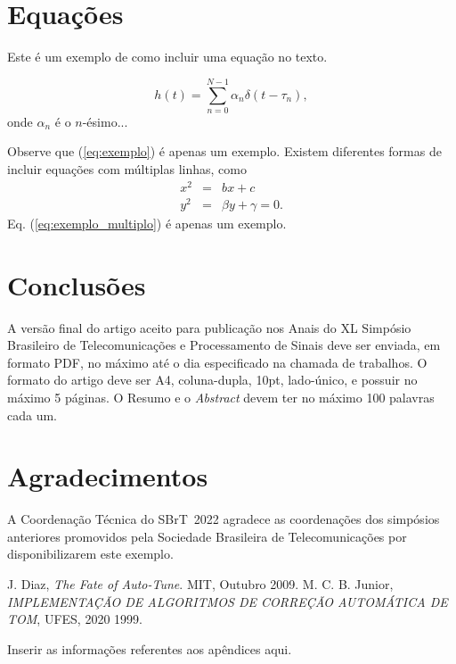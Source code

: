 \documentclass{sbrt}
\begin{document}

\section{Equações}

Este é um exemplo de como incluir uma equação no texto.

\begin{equation}\label{eq:exemplo}
    h(t)=\sum_{n=0}^{N-1} \alpha_n\delta(t-\tau_n),
\end{equation}
onde $\alpha_n$ é o $n$-ésimo...

Observe que (\ref{eq:exemplo}) é apenas um exemplo. Existem diferentes formas de incluir equações com múltiplas linhas, como
\begin{equation} \label{eq:exemplo_multiplo}
    \begin{array}{ccl}
        x^2 & = & bx+c\\
        y^2 & = &\beta y+\gamma=0.
    \end{array}
\end{equation}
Eq. (\ref{eq:exemplo_multiplo}) é apenas um exemplo.


\section{Conclusões}
A versão final do artigo aceito para publicação nos Anais do XL Simpósio Brasileiro de Telecomunicações e Processamento de Sinais deve ser enviada, em formato PDF, no máximo até o dia especificado na chamada de trabalhos. O formato do artigo deve ser A4, coluna-dupla, 10pt, lado-único, e possuir no máximo 5 páginas. O Resumo e o \emph{Abstract} devem ter no máximo 100 palavras cada um.


\section*{Agradecimentos}
A Coordenação Técnica do SBrT~2022 agradece as coordenações dos simpósios anteriores promovidos pela Sociedade Brasileira de Telecomunicações por disponibilizarem este exemplo.

\begin{thebibliography}{99}
 J. Diaz, \textit{The Fate of Auto-Tune}. MIT, Outubro 2009.
 M. C. B. Junior, \textit{IMPLEMENTAÇÃO DE ALGORITMOS DE CORREÇÃO AUTOMÁTICA DE TOM}, UFES, 2020 1999.
\end{thebibliography}

\appendix
Inserir as informações referentes aos apêndices aqui.
\end{document}
